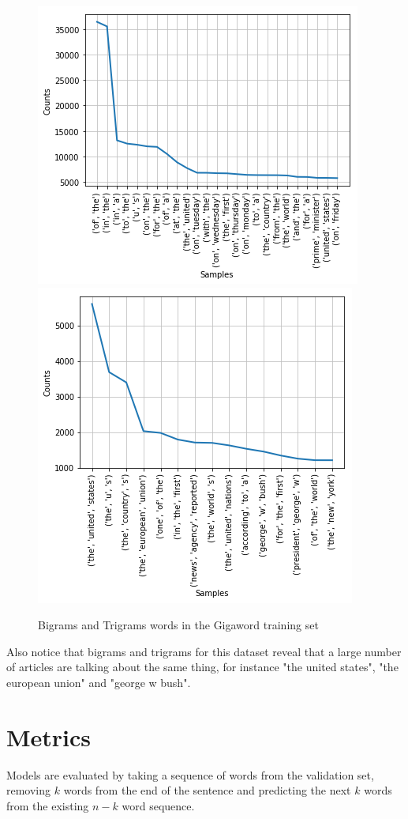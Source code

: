 \documentclass[a4paper]{article}
\begin{document}
\begin{figure}[!ht]
\includegraphics[width=0.7\columnwidth]{sr-eda-gigaword-bigrams}
\includegraphics[width=0.7\columnwidth]{sr-eda-gigaword-trigrams}
\centering
\caption{Bigrams and Trigrams words in the Gigaword training set}
\end{figure}

Also notice that bigrams and trigrams for this dataset reveal that a
large number of articles are talking about the same thing, for instance
"the united states", "the european union" and "george w bush".

\section{Metrics}
\label{sec:metrics}

Models are evaluated by taking a sequence
of words from the validation set, removing
$k$ words from the end of the sentence and predicting
the next $k$ words from the existing $n - k$ word sequence.
\end{document}
